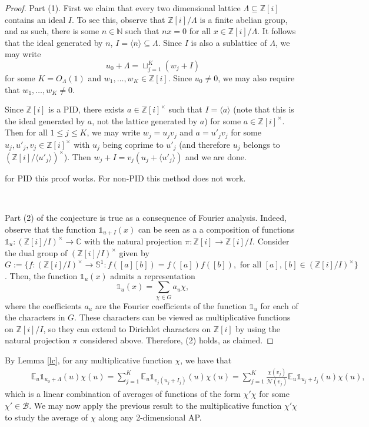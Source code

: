 \documentclass[11pt]{amsart}
\theoremstyle{definition}
\newcommand{\C}{{\mathbb C}}
\newcommand{\N}{{\mathbb N}}
\newcommand{\NN}{{\mathcal N}}
\renewcommand{\S}{\mathbb{S}}
\newcommand{\Z}{{\mathbb Z}}
\begin{document}
\begin{proof}
Part (1). First we claim that every two dimensional lattice $\Lambda\subseteq \Z[i]$ contains an ideal $I$. To see this, observe that $\Z[i]/\Lambda$ is a finite abelian group, and as such, there is some $n \in \N$ such that $nx=0$ for all $x \in \Z[i]/\Lambda$. It follows that the ideal generated by $n$, $I=\langle n \rangle \subseteq \Lambda$. Since $I$ is also a sublattice of $\Lambda$, we may write
$$u_{0}+\Lambda=\sqcup_{j=1}^{K}(w_{j}+I)$$
for some $K=O_{\Lambda}(1)$ and $w_{1},\dots,w_{K}\in \Z[i]$.
Since $u_{0}\neq 0$, we may also require that $w_{1},\dots,w_{K}\neq 0$.


Since $\Z[i]$ is a PID, there exists $a \in \Z[i]^{\times}$ such that $I=\langle a\rangle$ (note that this is the ideal generated by $a$, not the lattice generated by $a$) for some $a\in\Z[i]^{\times}$. Then for all $1\leq j\leq K$, we may write $w_{j}=u_{j}v_{j}$ and $a=u'_{j}v_{j}$ for some $u_{j},u'_{j},v_{j}\in \Z[i]^{\times}$ with $u_{j}$ being coprime to $u'_{j}$ (and therefore $u_{j}$ belongs to $(\Z[i]/\langle u'_{j}\rangle)^{\times}$). Then $w_{j}+I=v_{j}(u_{j}+\langle u'_{j}\rangle)$ and we are done.

{\color{red} for PID this proof works. For non-PID this method does not work.}

\


Part (2) of the conjecture is true as a consequence of Fourier analysis. Indeed, observe that the function $\mathds{1}_{u+I}(x)$ can be seen as a a composition of functions $\mathds{1}_{u} : (\Z[i]/I)^{\times} \to \C$ with the natural projection $\pi: \Z[i] \to \Z[i]/I$. Consider the dual group of $(\Z[i]/I)^{\times}$ given by $G:=\{ f : (\Z[i]/I)^{\times} \to \S^1 : f([a][b])=f([a])f([b]), \text{ for all } [a], [b] \in (\Z[i]/I)^{\times}\}$. Then, the function $\mathds{1}_{u}(x)$ admits a representation
\[
\mathds{1}_u(x)=\sum_{\chi \in G} a_u \chi,
\]
where the coefficients $a_u$ are the Fourier coefficients of the function $\mathds{1}_u$ for each of the characters in $G$. These characters can be viewed as multiplicative functions on $\Z[i]/I$, so they can extend to Dirichlet characters on $\Z[i]$ by using the natural projection $\pi$ considered above. Therefore, (2) holds, as claimed.
\end{proof}

By Lemma \ref{lc}, for any multiplicative function $\chi$, we have that
\begin{equation*}
    \begin{split}
        &\qquad\mathbb{E}_{u}\mathds{1}_{u_{0}+\Lambda}(u)\chi(u)
        =\sum_{j=1}^{K}\mathbb{E}_{u}\mathds{1}_{v_{j}(u_{j}+I_{j})}(u)\chi(u)
        =\sum_{j=1}^{K}\frac{\chi(v_{j})}{\NN(v_{j})}\mathbb{E}_{u}\mathds{1}_{u_{j}+I_{j}}(u)\chi(u),
    \end{split}
\end{equation*}
which is a linear combination of averages of functions of the form $\chi'\chi$ for some $\chi'\in\mathcal{B}$. We may now apply the previous result to the multiplicative function $\chi'\chi$ to study the average of $\chi$ along any 2-dimensional AP.
\fi
\end{document}
